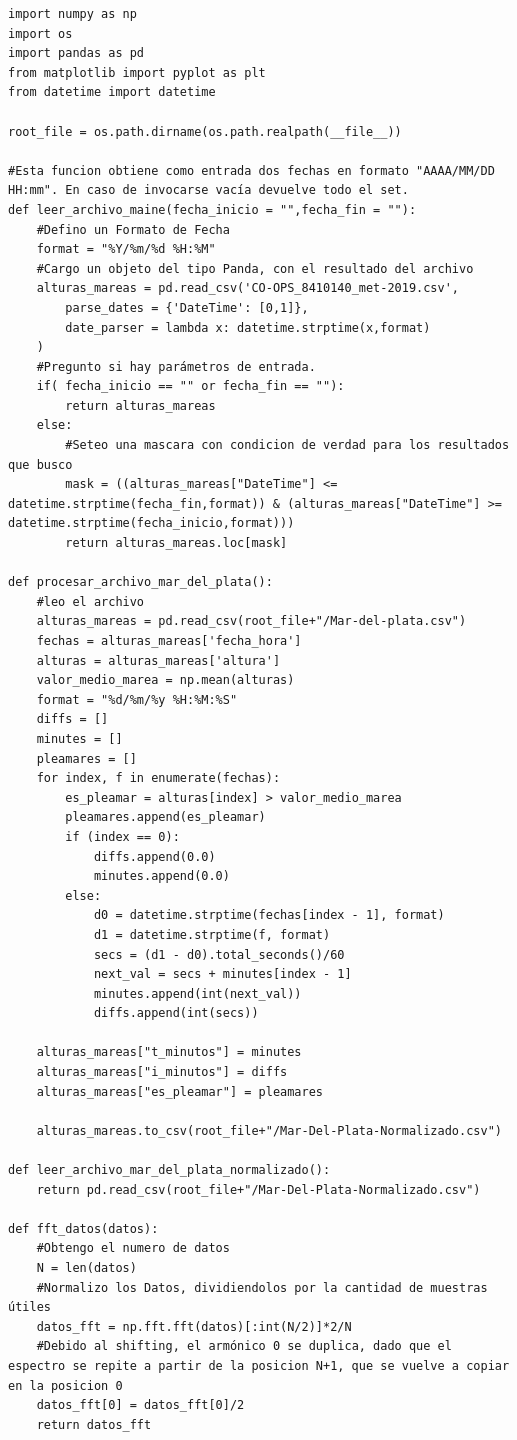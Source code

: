 \documentclass[10pt,a4paper]{article}
\numberwithin{equation}{section}
\numberwithin{figure}{section}
\numberwithin{table}{section}
\begin{document}
\begin{verbatim}
import numpy as np
import os
import pandas as pd
from matplotlib import pyplot as plt
from datetime import datetime

root_file = os.path.dirname(os.path.realpath(__file__))

#Esta funcion obtiene como entrada dos fechas en formato "AAAA/MM/DD HH:mm". En caso de invocarse vacía devuelve todo el set.
def leer_archivo_maine(fecha_inicio = "",fecha_fin = ""):
    #Defino un Formato de Fecha
    format = "%Y/%m/%d %H:%M"
    #Cargo un objeto del tipo Panda, con el resultado del archivo
    alturas_mareas = pd.read_csv('CO-OPS_8410140_met-2019.csv', 
        parse_dates = {'DateTime': [0,1]},
        date_parser = lambda x: datetime.strptime(x,format)
    )
    #Pregunto si hay parámetros de entrada.
    if( fecha_inicio == "" or fecha_fin == ""):
        return alturas_mareas
    else:
        #Seteo una mascara con condicion de verdad para los resultados que busco
        mask = ((alturas_mareas["DateTime"] <= datetime.strptime(fecha_fin,format)) & (alturas_mareas["DateTime"] >= datetime.strptime(fecha_inicio,format)))
        return alturas_mareas.loc[mask]

def procesar_archivo_mar_del_plata():
    #leo el archivo
    alturas_mareas = pd.read_csv(root_file+"/Mar-del-plata.csv")
    fechas = alturas_mareas['fecha_hora']
    alturas = alturas_mareas['altura']
    valor_medio_marea = np.mean(alturas)
    format = "%d/%m/%y %H:%M:%S"
    diffs = []
    minutes = []
    pleamares = []
    for index, f in enumerate(fechas):
        es_pleamar = alturas[index] > valor_medio_marea
        pleamares.append(es_pleamar)
        if (index == 0):
            diffs.append(0.0)
            minutes.append(0.0)
        else:
            d0 = datetime.strptime(fechas[index - 1], format)
            d1 = datetime.strptime(f, format)
            secs = (d1 - d0).total_seconds()/60
            next_val = secs + minutes[index - 1]
            minutes.append(int(next_val))
            diffs.append(int(secs))

    alturas_mareas["t_minutos"] = minutes
    alturas_mareas["i_minutos"] = diffs
    alturas_mareas["es_pleamar"] = pleamares

    alturas_mareas.to_csv(root_file+"/Mar-Del-Plata-Normalizado.csv")

def leer_archivo_mar_del_plata_normalizado():
    return pd.read_csv(root_file+"/Mar-Del-Plata-Normalizado.csv")

def fft_datos(datos):
    #Obtengo el numero de datos
    N = len(datos)
    #Normalizo los Datos, dividiendolos por la cantidad de muestras útiles
    datos_fft = np.fft.fft(datos)[:int(N/2)]*2/N
    #Debido al shifting, el armónico 0 se duplica, dado que el espectro se repite a partir de la posicion N+1, que se vuelve a copiar en la posicion 0
    datos_fft[0] = datos_fft[0]/2
    return datos_fft
    



\end{verbatim}
\end{document}
